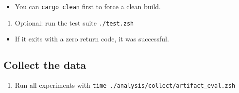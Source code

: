 \begin{itemize}
\tightlist
\item
  You can \texttt{cargo\ clean} first to force a clean build.
\end{itemize}

\begin{enumerate}
\def\labelenumi{\arabic{enumi}.}
\setcounter{enumi}{4}
\tightlist
\item
  Optional: run the test suite \texttt{./test.zsh}
\end{enumerate}

\begin{itemize}
\tightlist
\item
  If it exits with a zero return code, it was successful.
\end{itemize}

\hypertarget{collect-the-data}{%
\subsection{Collect the data}\label{collect-the-data}}

\begin{enumerate}
\def\labelenumi{\arabic{enumi}.}
\tightlist
\item
  Run all experiments with
  \texttt{time\ ./analysis/collect/artifact\_eval.zsh}
\end{enumerate}

